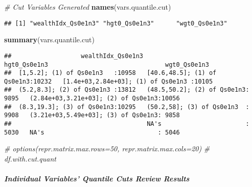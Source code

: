 \documentclass[
]{article}
\newenvironment{Shaded}{\begin{snugshade}}{\end{snugshade}}
\newcommand{\CommentTok}[1]{\textcolor[rgb]{0.56,0.35,0.01}{\textit{#1}}}
\newcommand{\ControlFlowTok}[1]{\textcolor[rgb]{0.13,0.29,0.53}{\textbf{#1}}}
\newcommand{\DataTypeTok}[1]{\textcolor[rgb]{0.13,0.29,0.53}{#1}}
\newcommand{\KeywordTok}[1]{\textcolor[rgb]{0.13,0.29,0.53}{\textbf{#1}}}
\newcommand{\NormalTok}[1]{#1}
\newcommand{\OperatorTok}[1]{\textcolor[rgb]{0.81,0.36,0.00}{\textbf{#1}}}
\newcommand{\StringTok}[1]{\textcolor[rgb]{0.31,0.60,0.02}{#1}}
\begin{document}
\begin{Shaded}
\begin{Highlighting}[]
\CommentTok{# Cut Variables Generated}
\KeywordTok{names}\NormalTok{(vars.quantile.cut)}
\end{Highlighting}
\end{Shaded}

\begin{verbatim}
## [1] "wealthIdx_Qs0e1n3" "hgt0_Qs0e1n3"      "wgt0_Qs0e1n3"
\end{verbatim}

\begin{Shaded}
\begin{Highlighting}[]
\KeywordTok{summary}\NormalTok{(vars.quantile.cut)}
\end{Highlighting}
\end{Shaded}

\begin{verbatim}
##                   wealthIdx_Qs0e1n3                      hgt0_Qs0e1n3                                wgt0_Qs0e1n3  
##  [1,5.2]; (1) of Qs0e1n3   :10958   [40.6,48.5]; (1) of Qs0e1n3:10232   [1.4e+03,2.84e+03]; (1) of Qs0e1n3 :10105  
##  (5.2,8.3]; (2) of Qs0e1n3 :13812   (48.5,50.2]; (2) of Qs0e1n3: 9895   (2.84e+03,3.21e+03]; (2) of Qs0e1n3:10056  
##  (8.3,19.3]; (3) of Qs0e1n3:10295   (50.2,58]; (3) of Qs0e1n3  : 9908   (3.21e+03,5.49e+03]; (3) of Qs0e1n3: 9858  
##                                     NA's                       : 5030   NA's                               : 5046
\end{verbatim}

\begin{Shaded}
\begin{Highlighting}[]
\CommentTok{# options(repr.matrix.max.rows=50, repr.matrix.max.cols=20)}
\CommentTok{# df.with.cut.quant}
\end{Highlighting}
\end{Shaded}

\hypertarget{individual-variables-quantile-cuts-review-results}{%
\subparagraph{Individual Variables' Quantile Cuts Review
Results}\label{individual-variables-quantile-cuts-review-results}}

\begin{Shaded}
\end{Shaded}
\end{document}
